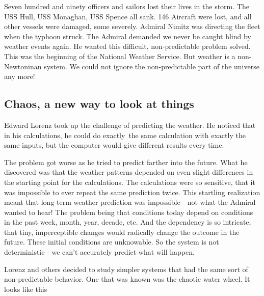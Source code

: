 \documentclass{article}
\begin{document}
Seven hundred and ninety officers and sailors lost their lives in the storm.
The USS Hull, USS Monaghan, USS Spence all sank. 146 Aircraft were lost, and
all other vessels were damaged, some severely.\cite{Chen} Admiral Nimitz was
directing the fleet when the typhoon struck. The Admiral demanded we never
be caught blind by weather events again. He wanted this difficult,
non-predictable problem solved. This was the beginning of the National
Weather Service. But weather is a non-Newtoninan system. We could not ignore
the non-predictable part of the universe any more!

\subsection{Chaos, a new way to look at things}

Edward Lorenz took up the challenge of predicting the weather. He noticed
that in his calculations, he could do exactly\ the same calculation with
exactly the same inputs, but the computer would give different results every
time. 

The problem got worse as he tried to predict farther into the future. What
he discovered was that the weather patterns depended on even slight
differences in the starting point for the calculations. The calculations
were so sensitive, that it was impossible to ever repeat the same prediction
twice. This startling realization meant that long-term weather prediction
was impossible---not what the Admiral wanted to hear! The problem being that
conditions today depend on conditions in the past week, month, year, decade,
etc. And the dependency is so intricate, that tiny, imperceptible changes
would radically change the outcome in the future. These initial conditions
are unknowable. So the system is not deterministic---we can't accurately
predict what will happen.

Lorenz and others decided to study simpler systems that had the same sort of
non-predictable behavior. One that was known was the chaotic water wheel. It
looks like this
\end{document}
